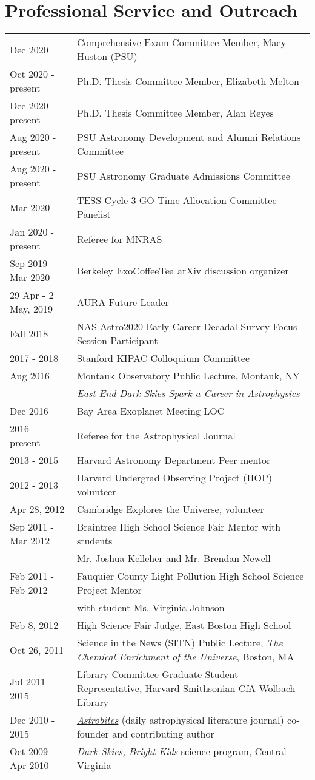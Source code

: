 \section*{Professional Service and Outreach}
\begin{tabular*}{\textwidth}{@{\hspace{10pt}}p{1.4in}l}
Dec 2020 & Comprehensive Exam Committee Member, Macy Huston (PSU)\\
Oct 2020 - present & Ph.D. Thesis Committee Member, Elizabeth Melton\\
Dec 2020 - present & Ph.D. Thesis Committee Member, Alan Reyes\\
Aug 2020 - present & PSU Astronomy Development and Alumni Relations Committee \\
Aug 2020 - present & PSU Astronomy Graduate Admissions Committee \\ 
Mar 2020 & TESS Cycle 3 GO Time Allocation Committee Panelist \\
Jan 2020 - present & Referee for MNRAS \\ 
Sep 2019 - Mar 2020 & Berkeley ExoCoffeeTea arXiv discussion organizer \\ 
29 Apr - 2 May, 2019 & AURA Future Leader \\
Fall 2018 & NAS Astro2020 Early Career Decadal Survey Focus Session Participant \\
2017 - 2018 & Stanford KIPAC Colloquium Committee \\
Aug 2016 & Montauk Observatory Public Lecture, Montauk, NY \\
&  \emph{East End Dark Skies Spark a Career in Astrophysics}\\
Dec 2016 & Bay Area Exoplanet Meeting LOC \\
2016 - present & Referee for the Astrophysical Journal \\
2013 - 2015 & Harvard Astronomy Department Peer mentor\\
2012 - 2013 & Harvard Undergrad Observing Project (HOP) volunteer\\
Apr 28, 2012 & Cambridge Explores the Universe, volunteer\\
Sep 2011 - Mar 2012 & Braintree High School Science Fair Mentor with students\\
& Mr. Joshua Kelleher and Mr. Brendan Newell\\
Feb 2011 - Feb 2012 & Fauquier County Light Pollution High School Science Project Mentor\\
& with student Ms. Virginia Johnson\\
Feb 8, 2012 & High Science Fair Judge, East Boston High School\\
Oct 26, 2011 & Science in the News (SITN) Public Lecture, \emph{The Chemical Enrichment of the Universe}, Boston, MA\\
Jul 2011 - 2015 & Library Committee Graduate Student Representative, Harvard-Smithsonian CfA Wolbach Library\\
Dec 2010 - 2015 & \href{http://astrobites.com/}{\emph{Astrobites}} (daily astrophysical literature journal) co-founder and contributing author\\
Oct 2009 - Apr 2010 & \emph{Dark Skies, Bright Kids} science program, Central Virginia\\
\end{tabular*}
